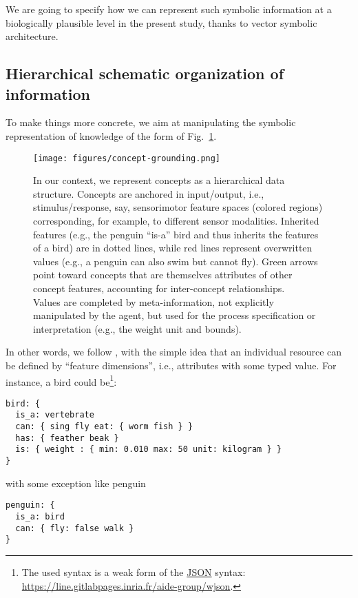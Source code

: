 \documentclass[sn-mathphys]{sn-jnl}
\newcommand{\hhref}[1]{\href{#1}{#1}}
\begin{document}
We are going to specify how we can represent such symbolic information at a biologically plausible level in the present study, thanks to vector symbolic architecture.

\subsection{Hierarchical schematic organization of information} \label{hierarchical}

To make things more concrete, we aim at manipulating the symbolic representation of knowledge of the form of Fig.~\ref{concept-grounding}.

\begin{figure}[htbp]
\centerline{\texttt{[image: figures/concept-grounding.png]}}
\caption{In our context, we represent concepts as a hierarchical data structure. Concepts are anchored in input/output, i.e., stimulus/response, say, sensorimotor feature spaces (colored regions) corresponding, for example, to different sensor modalities. Inherited features (e.g., the penguin “is-a” bird and thus inherits the features of a bird) are in dotted lines, while red lines represent overwritten values (e.g., a penguin can also swim but cannot fly). Green arrows point toward concepts that are themselves attributes of other concept features, accounting for inter-concept relationships.
\\ Values are completed by meta-information, not explicitly manipulated by the agent, but used for the process specification or interpretation (e.g., the weight unit and bounds).}
\label{concept-grounding}
\end{figure}

In other words, we follow \cite{gardenfors_conceptual_2004}, with the simple idea that an individual resource can be defined by ``feature dimensions'', i.e., attributes with some typed value. For instance, a bird could be\footnote{The used syntax is a weak form of the \href{https://www.json.org}{JSON} syntax: \hhref{https://line.gitlabpages.inria.fr/aide-group/wjson}.}:

\begin{lstlisting}[basicstyle=\small]
bird: {
  is_a: vertebrate
  can: { sing fly eat: { worm fish } }
  has: { feather beak }
  is: { weight : { min: 0.010 max: 50 unit: kilogram } }
}\end{lstlisting}
with some exception like penguin
\begin{lstlisting}[basicstyle=\small]
penguin: {
  is_a: bird
  can: { fly: false walk }
}
\end{lstlisting}
\end{document}
